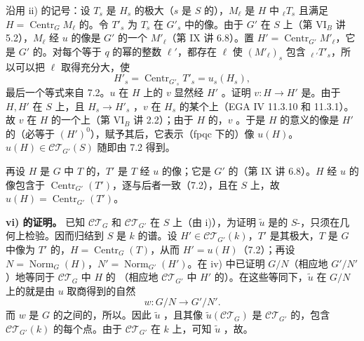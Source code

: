 沿用 ii) 的记号：设 $T_s$ 是 $H_s$ 的极大（$s$ 是 $S$ 的），$M_\ell$ 是 $H$ 中 ${}_\ell T_s$ 且满足 $H=\operatorname{Centr}_G M_\ell$ 的。令 $T'_s$ 为 $T_s$ 在 $G'_s$ 中的像。由于 $G'$ 在 $S$ 上（第 VI$_B$ 讲 5.2），$M_\ell$ 经 $u$ 的像是 $G'$ 的一个 $M'_\ell$（第 IX 讲 6.8）。置 $H'=\operatorname{Centr}_{G'}M'_\ell$，它是 $G'$ 的。对每个等于 $q$ 的幂的整数 $\ell'$，都存在 $\ell$ 使 $(M'_\ell)_s$ 包含 ${}_{\ell'}T'_s$，所以可以把 $\ell$ 取得充分大，使
\[H'_s=\operatorname{Centr}_{G'_s}T'_s=u_s(H_s),\]
最后一个等式来自 7.2。$u$ 在 $H$ 上的 $v$ 显然经 $H'$ 。证明 $v:H\to H'$ 是。由于 $H,H'$ 在 $S$ 上，且 $H_s\to H'_s$ ，$v$ 在 $H_s$ 的某个上（EGA IV 11.3.10 和 11.3.1）。故 $v$ 在 $H$ 的一个上（第 VI$_B$ 讲 2.2）；由于 $H$ 的，$v$ 。于是 $H$ 的意义的像是 $H'$ 的（必等于 $(H')^0$），赋予其后，它表示（fpqc 下的）像 $u(H)$。$u(H)\in\mathcal{CT}_{G'}(S)$ 随即由 7.2 得到。

再设 $H$ 是 $G$ 中 $T$ 的，$T'$ 是 $T$ 经 $u$ 的像；它是 $G'$ 的（第 IX 讲 6.8）。$H$ 经 $u$ 的像包含于 $\operatorname{Centr}_{G'}(T')$，逐与后者一致（7.2），且在 $S$ 上，故 $u(H)=\operatorname{Centr}_{G'}(T')$。

\textbf{vi) 的证明。} 已知 $\mathcal{CT}_G$ 和 $\mathcal{CT}_{G'}$ 在 $S$ 上（由 i)），为证明 $\widetilde u$ 是的 $S$-，只须在几何上检验。因而归结到 $S$ 是 $k$ 的谱。设 $H'\in\mathcal{CT}_{G'}(k)$，$T'$ 是其极大，$T$ 是 $G$ 中像为 $T'$ 的，$H=\operatorname{Centr}_G(T)$，从而 $H'=u(H)$（7.2）；再设 $N=\operatorname{Norm}_G(H)$，$N'=\operatorname{Norm}_{G'}(H')$。在 iv) 中已证明 $G/N$（相应地 $G'/N'$）地等同于 $\mathcal{CT}_G$ 中 $H$ 的
（相应地 $\mathcal{CT}_{G'}$ 中 $H'$ 的）。在这些等同下，$\widetilde u$ 在 $G/N$ 上的就是由 $u$ 取商得到的自然
\[w:G/N\longrightarrow G'/N'.\]
而 $w$ 是 $G$ 的之间的，所以。因此 $\widetilde u$ ，且其像 $\widetilde u(\mathcal{CT}_G)$ 是 $\mathcal{CT}_{G'}$ 的，包含 $\mathcal{CT}_{G'}(k)$ 的每个点。由于 $\mathcal{CT}_{G'}$ 在 $k$ 上，可知 $\widetilde u$ ，故。


